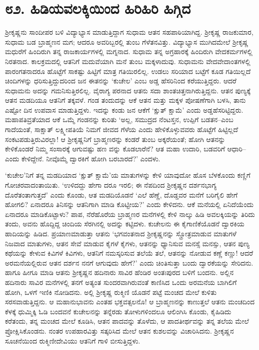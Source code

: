 
\chapter{೮೨. ಹಿಡಿಯವಲಕ್ಕಿಯಿಂದ ಹಿರಿಹಿರಿ ಹಿಗ್ಗಿದ}

ಶ್ರೀಕೃಷ್ಣನು ಸಾಂದೀಪರ ಬಳಿ ವಿದ್ಯಾಭ್ಯಾಸ ಮಾಡುತ್ತಿದ್ದಾಗ ಸುಧಾಮ ಆತನ ಸಹಪಾಠಿಯಾಗಿದ್ದ. ಶ್ರೀಕೃಷ್ಣ ರಾಜಕುಮಾರ, ಸುಧಾಮ ಬಡ ಬ್ರಾಹ್ಮಣನ ಮಗ; ಆದರೂ ಅವರಿಬ್ಬರಲ್ಲಿ ತುಂಬ ಗೆಳೆತನವಿತ್ತು. ವಿದ್ಯಾಭ್ಯಾಸ ಮುಗಿದಮೇಲೆ ಶ್ರೀಕೃಷ್ಣ ಮಧುರೆಗೆ ಹಿಂದಿರುಗಿ ತನ್ನ ರಾಜಕಾರ್ಯಗಳಲ್ಲಿ ಮಗ್ನನಾದ. ಸುಧಾಮ ತನ್ನ ಅಗ್ರಹಾರಕ್ಕೆ ಹಿಂದಿರುಗಿ ವೇದಕರ್ಮಗಳಲ್ಲಿ ನಿರತನಾದ. ಕಾಲಕ್ರಮದಲ್ಲಿ ಆತನಿಗೆ ಮದುವೆಯಾಗಿ ಮನೆ ತುಂಬ ಮಕ್ಕಳಾದುವು. ಸುಧಾಮನು ವೇದವೇದಾಂತಗಳಲ್ಲಿ ಪಾರಂಗತನಾದರೂ ಹೊಟ್ಟೆಗೆ ಸಾಕಷ್ಟು ಹಿಟ್ಟಿಗೆ ಮಾತ್ರ ಗತಿಯಿರಲಿಲ್ಲ. ಉಡಲು ಸರಿಯಾದ ಬಟ್ಟೆಗೆ ಕೂಡ ಗತಿಯಿಲ್ಲದೆ ಚಿಂದಿಗಳನ್ನು ಧರಿಸುತ್ತಿದ್ದುದರಿಂದ ಜನ ಈತನನ್ನು ‘ಕುಚೇಲ’ ಎಂಬ ಅಡ್ಡ ಹೆಸರಿನಿಂದ ಕರೆಯುತ್ತಿದ್ದರು. ಆದರೆ ಸುಧಾಮನು ಅದನ್ನು ಗಮನಿಸುತ್ತಿರಲಿಲ್ಲ. ವೈರಾಗ್ಯ ಪರನಾದ ಆತನು ಸದಾ ಶಾಂತಚಿತ್ತನಾಗಿರುತ್ತಿದ್ದನು. ಆತನ ಪುಣ್ಯಕ್ಕೆ ಆತನ ಮಡದಿಯೂ ಆತನಿಗೆ ತಕ್ಕವಳೆ. ಗಂಡ ತಂದುದನ್ನು ಆಕೆ ಆತನ ಮತ್ತು ಮಕ್ಕಳ ಪೋಷಣೆಗಾಗಿ ಬಳಸಿ, ತಾನು ಎಷ್ಟೋ ದಿನ ಉಪವಾಸ ಮಾಡುತ್ತಿದ್ದಳು. ಇದನ್ನು ಕಂಡು ಜನ ಆಕೆಗೆ ‘ಕ್ಷುತ್ ಕ್ಷಾಮೆ’ ಎಂದು ಅಡ್ಡಹೆಸರಿಟ್ಟಿದ್ದರು. ಮಹಾಪತಿವ್ರತೆಯಾದ ಆಕೆ ಒಮ್ಮೆ ಗಂಡನನ್ನು ಕುರಿತು ‘ಅಲ್ಲ, ಸಮುದ್ರದ ನೆಂಟಸ್ತನ, ಉಪ್ಪಿಗೆ ಬಡತನ–ಎಂಬ ಗಾದೆಯಂತೆ, ಸಾಕ್ಷಾತ್ ಲಕ್ಷ್ಮೀಪತಿಯೆ ನಿಮಗೆ ಜೀವದ ಗೆಳೆಯ ಎಂದು ಹೇಳಿಕೊಳ್ಳುವವರು ಹೊಟ್ಟೆಗೆ ಹಿಟ್ಟಿಲ್ಲದೆ ಸಂಕಟಪಡುತ್ತಿರುವಿರಲ್ಲಾ! ಆ ಶ್ರೀಕೃಷ್ಣನಿಗೆ ಬ್ರಾಹ್ಮಣರನ್ನು ಕಂಡರೆ ತುಂಬ ಅಕ್ಕರೆಯಂತೆ; ಹೋಗಿ ಆತನನ್ನು ಕೇಳಿಕೊಂಡರೆ ನಿಮ್ಮ ಸಂಸಾರಕ್ಕೆ ಆಗುವಷ್ಟು ಹಣ ವನ್ನು ಕೊಡಲಾರೆನೆ? ಆತ ಮಹಾ ಉದಾರಿ, ಬಡವರಿಗೆ ಆಧಾರಿ–ಎಂದು ಕೇಳಿದ್ದೇನೆ. ನೀವೊಮ್ಮೆ ದ್ವಾರಕಿಗೆ ಹೋಗಿ ಬರಬಾರದೆ?’ ಎಂದಳು.

‘ಕುಚೇಲ’ನಿಗೆ ತನ್ನ ಮಡದಿಯಾದ ‘ಕ್ಷುತ್ ಕ್ಷಾಮೆ’ಯ ಮಾತುಗಳನ್ನು ಕೇಳಿ ಯಾವುದೋ ಹೊಸ ಬೆಳಕೊಂದು ಕಣ್ಣಿಗೆ ಗೋಚರವಾದಂತಾಯಿತು. ‘ಉಳಿದದ್ದು ಹೇಗಾ ದರೂ ಇರಲಿ; ಈ ನೆಪದಿಂದ ಶ್ರೀಕೃಷ್ಣನ ದರ್ಶನಭಾಗ್ಯ ದೊರೆತಂತಾಗುತ್ತದೆ’ ಎಂದು ಕೊಂಡು, ಆತ ಮಡದಿಯೊಡನೆ ‘ಎಲೆ ಹೆಣ್ಣೆ, ದೊಡ್ಡವರ ಮನೆಗೆ ಬರಿಗೈಲಿ ಹೇಗೆ ಹೋಗಲಿ? ಏನಾದರೂ ತಿನಿಸನ್ನು ಆತನಿಗಾಗಿ ಮಾಡಿ ಕೊಟ್ಟೀಯ?’ ಎಂದು ಕೇಳಿದನು. ಆಕೆ ಮನೆಯಲ್ಲಿ ಏನಿದೆಯೆಂದು ಏನಾದರೂ ಮಾಡಿಕೊಟ್ಟಾಳು? ಪಾಪ, ನೆರೆಹೊರೆಯ ಬ್ರಾಹ್ಮಣರ ಮನೆಗಳಲ್ಲಿ ಕೇಳಿ ನಾಲ್ಕು ಹಿಡಿ ಅವಲಕ್ಕಿಯನ್ನು ತಿರಿದು ತಂದು, ಅವನು ಹೊದ್ದಿದ್ದ ಚಿಂದಿಯ ಸೆರಗಿನಲ್ಲಿ ಅದನ್ನು ಕಟ್ಟಿದಳು. ಕುಚೇಲನು ಈ ಕೈಗಾಣಿಕೆಯೊಡನೆ ದ್ವಾರಕಿಯ ಹಾದಿಯನ್ನು ಹಿಡಿದ. ಪ್ರಯಾಣಮಾಡುತ್ತಾ ಆತನು ‘ಭಗವಂತನಾದ ಶ್ರೀಕೃಷ್ಣನನ್ನು ಸ್ತ್ರೋತ್ರಮಾಡುವ ಮಾತುಗಳೆ ನಿಜವಾದ ಮಾತುಗಳು, ಆತನ ಸೇವೆ ಮಾಡುವ ಕೈಗಳೆ ಕೈಗಳು, ಆತನನ್ನು ಧ್ಯಾನಿಸುವ ಮನಸ್ಸೆ ಮನಸ್ಸು, ಆತನ ಪುಣ್ಯ ಕಥೆಯನ್ನು ಕೇಳುವ ಕಿವಿಗಳೆ ಕಿವಿಗಳು, ಆತನಿಗೆ ನಮಸ್ಕರಿಸುವ ತಲೆಯೆ ತಲೆ, ಆತನನ್ನು ನೋಡುವ ಕಣ್ಣೆ ಕಣ್ಣು! ಆದರೆ ಅರಮನೆಯಲ್ಲಿರುವ ಆತನ ದರ್ಶನ ನನಗೆ ಆಗುವುದು ಹೇಗೆ?’ ಎಂದು ಚಿಂತಿಸುತ್ತಾ ಬಂದು ದ್ವಾರಕೆಯನ್ನು ಸೇರಿದನು. ಹಾಗೂ ಹೀಗೂ ಮಾಡಿ ಆತನು ಶ್ರೀಕೃಷ್ಣನ ಹದಿನಾರು ಸಾವಿರ ಹೆಂಡಿರ ಅಂತಃಪುರದ ಬಳಿಗೆ ಬಂದನು. ಅಲ್ಲಿನ ಹದಿನಾರು ಸಾವಿರ ಮನೆಗಳಲ್ಲಿ ತನಗೆ ಅತ್ಯಂತ ಸುಂದರವಾಗಿರುವಂತೆ ಕಾಣಿಸಿದ ಒಂದು ಅರಮನೆಯ ಬಾಗಿಲಿಗೆ ಹೋಗಿ, ಒಳಗೆ ಇಣಿಕಿ ನೋಡಿದನು. ಅಲ್ಲಿ ಶ್ರೀಕೃಷ್ಣ ರುಕ್ಮಿಣಿ ಯೊಡನೆ ಪಟ್ಟೆ ಮಂಚದ ಮೇಲೆ ಕುಳಿತು ಸರಸವಾಡುತ್ತಿದ್ದನು. ಆ ಮಹಾನುಭಾವನು ಎಂತಹ ಭಕ್ತವತ್ಸಲನೊ! ಆ ಬ್ರಾಹ್ಮಣನನ್ನು ಕಾಣುತ್ತಲೆ ಆತನು ಮಂಚದಿಂದ ಕೆಳಕ್ಕೆ ಧುಮ್ಮಿಕ್ಕಿ ಓಡಿ ಬಂದವನೆ ಕುಚೇಲನನ್ನು ತನ್ನೆರಡು ತೋಳುಗಳಿಂದಲೂ ಆಲಿಂಗಿಸಿ ಕೊಂಡು, ಕೈಹಿಡಿದು ಕರೆತಂದು, ತನ್ನ ಮಂಚದ ಮೇಲೆ ಕೂಡಿಸಿ, ಆತನ ಪಾದವನ್ನು ತೊಳೆದು, ಆ ಪಾದತೀರ್ಥವನ್ನು ತನ್ನ ತಲೆಯ ಮೇಲೆ ಪ್ರೋಕ್ಷಿಸಿಕೊಂಡನು. ನಂತರ ಉಪಹಾರವಿತ್ತು ಸತ್ಕರಿಸಿದ ಮೇಲೆ ಆತನ ಕುಶಲವನ್ನು ವಿಚಾರಿಸಿದನು. ಶ್ರೀಕೃಷ್ಣನ ಸೂಚನೆಯಿಂದ ರುಕ್ಮಿಣೀದೇವಿಯು ಆತನಿಗೆ ಗಾಳಿ ಬೀಸುತ್ತಿದ್ದಳು.

